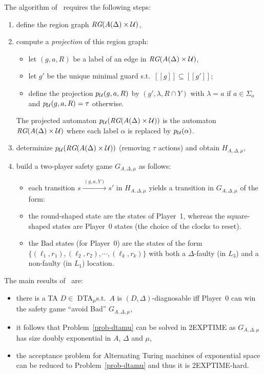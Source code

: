 \documentclass[letterpaper,10pt,conference]{ieeeconf}  \IEEEoverridecommandlockouts                              \overrideIEEEmargins
\def\st{{s.t.}~}
\newcommand{\sem}[1]{[\![#1]\!]}
\def\calU{{\cal U}}
\def\tauac{\tau}
\def\dtamu{DTA$_\mu$\xspace}
\def\rg{\textit{RG}}
\begin{document}
The algorithm of~\cite{Bouyerfossacs05} requires the following steps:
\begin{enumerate}
\item define the region graph $\rg(A(\Delta) \times \calU)$,
\item compute a \emph{projection} of this region graph:
  \begin{itemize}
  \item let $(g,a,R)$ be a label of an edge in $\rg(A(\Delta)
    \times \calU)$,
  \item let $g'$ be the unique minimal guard \st $\sem{g} \subseteq
    \sem{g'}$;
  \item define the projection $p_\calU(g,a,R)$ by $(g',\lambda,R \cap
    Y)$ with $\lambda=a$ if $a \in \Sigma_o$ and
    $p_\calU(g,a,R)=\tauac$ otherwise.
  \end{itemize}
  The projected automaton $p_\calU(\rg(A(\Delta) \times \calU))$ is
  the automaton $\rg(A(\Delta) \times \calU)$ where each label
  $\alpha$ is repla\-ced by $p_\calU(\alpha)$.
\item determinize $p_\calU(\rg(A(\Delta) \times \calU))$ (removing
  $\tauac$ actions) and obtain $H_{A,\Delta,\mu}$,
\item build a two-player safety game $G_{A,\Delta,\mu}$ as follows:
  \begin{itemize}
  \item each transition $s  \xrightarrow{\ (g,a,Y) \ }  s'$
in $H_{A,\Delta,\mu}$ yi\-elds a transition in $G_{A,\Delta,\mu}$ of
    the form:

\begin{center}
    \end{center}

  \item the round-shaped state are the states of Player~1, whereas the
    square-shaped states are Player~0 states (the choice of the clocks
    to reset).
  \item the $\text{Bad}$ states (for Player~0) are the states of the
    form $\{(\ell_1,r_1),(\ell_2,r_2),\cdots,(\ell_k,r_k)\}$ with both
    a $\Delta$-faulty (in $L_3$) and a non-faulty (in $L_1$) location.
  \end{itemize}
\end{enumerate}
The main results of~\cite{Bouyerfossacs05} are:
\begin{itemize}
\item there is a TA $D \in$ \dtamu \st $A$ is $(D,\Delta)$-diagnosable
  iff Player~0 can win the safety game ``avoid Bad''
  $G_{A,\Delta,\mu}$,
\item it follows that Problem~\ref{prob-dtamu} can be solved in
  2EXPTIME as $G_{A,\Delta,\mu}$ has size doubly exponential in $A$,
  $\Delta$ and $\mu$,
\item the acceptance problem for Alternating Turing machines of exponential
  space can be reduced to Problem~\ref{prob-dtamu} and thus it
  is 2EXPTIME-hard.
\end{itemize}
\end{document}
